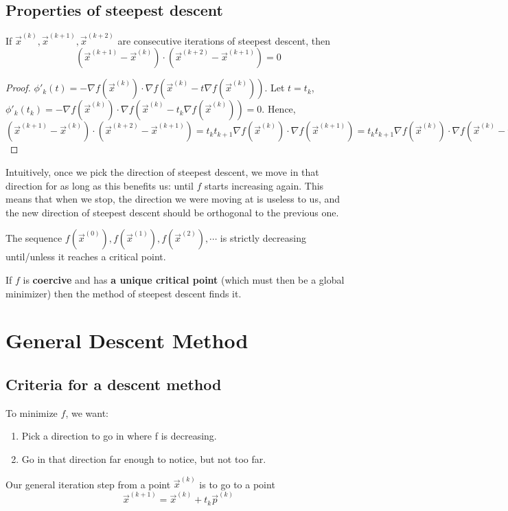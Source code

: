 \documentclass[11pt]{elegantbook}
\begin{document}
\subsection{Properties of steepest descent}
\begin{theorem}
    If $\vec{x}^{(k)},\vec{x}^{(k+1)},\vec{x}^{(k+2)}$ are consecutive iterations of steepest descent, then $$(\vec{x}^{(k+1)}-\vec{x}^{(k)})\cdot (\vec{x}^{(k+2)}-\vec{x}^{(k+1)})=0$$
\end{theorem}
\begin{proof}
    $\phi'_k(t)=-\nabla f(\vec{x}^{(k)})\cdot\nabla f(\vec{x}^{(k)}-t \nabla f(\vec{x}^{(k)}))$. Let $t=t_k$, $\phi'_k(t_k)=-\nabla f(\vec{x}^{(k)})\cdot\nabla f(\vec{x}^{(k)}-t_k \nabla f(\vec{x}^{(k)}))=0$. Hence, $(\vec{x}^{(k+1)}-\vec{x}^{(k)})\cdot (\vec{x}^{(k+2)}-\vec{x}^{(k+1)})=t_kt_{k+1} \nabla f(\vec{x}^{(k)})\cdot \nabla f(\vec{x}^{(k+1)})=t_kt_{k+1} \nabla f(\vec{x}^{(k)})\cdot \nabla f(\vec{x}^{(k)}-t_k \nabla f(\vec{x}^{(k)}))=0$
\end{proof}

Intuitively, once we pick the direction of steepest descent, we move in that direction for as long as this benefits us: until $f$ starts increasing again. This means that when we stop, the direction we were moving at is useless to us, and the new direction of steepest descent should be orthogonal to the previous one.

\begin{theorem}
    The sequence $f(\vec{x}^{(0)}), f(\vec{x}^{(1)}), f(\vec{x}^{(2)}), \cdots$ is strictly decreasing until/unless it reaches a critical point.
\end{theorem}

\begin{theorem}
    If $f$ is \textbf{coercive} and has \textbf{a unique critical point} (which must then be a global minimizer) then the method of steepest descent finds it.
\end{theorem}



\section{General Descent Method}
\subsection{Criteria for a descent method}
To minimize $f$, we want:
\begin{enumerate}
    \item Pick a direction to go in where f is decreasing.
    \item Go in that direction far enough to notice, but not too far.
\end{enumerate}
Our general iteration step from a point $\vec{x}^{(k)}$ is to go to a point
$$\vec{x}^{(k+1)}=\vec{x}^{(k)}+t_k \vec{p}^{(k)}$$
\end{document}
